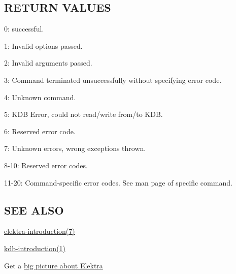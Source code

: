 \subsection*{R\+E\+T\+U\+RN V\+A\+L\+U\+ES}


\begin{DoxyItemize}
\item 0\+: successful.
\item 1\+: Invalid options passed.
\item 2\+: Invalid arguments passed.
\item 3\+: Command terminated unsuccessfully without specifying error code.
\item 4\+: Unknown command.
\item 5\+: K\+DB Error, could not read/write from/to K\+DB.
\item 6\+: Reserved error code.
\item 7\+: Unknown errors, wrong exceptions thrown.
\item 8-\/10\+: Reserved error codes.
\item 11-\/20\+: Command-\/specific error codes. See man page of specific command.
\end{DoxyItemize}

\subsection*{S\+EE A\+L\+SO}


\begin{DoxyItemize}
\item \hyperlink{md_doc_help_elektra-introduction_doc_help_elektra-introduction_md}{elektra-\/introduction(7)}
\item \hyperlink{md_doc_help_kdb-introduction_doc_help_kdb-introduction_md}{kdb-\/introduction(1)}
\item Get a \hyperlink{doc_BIGPICTURE_md}{big picture about Elektra} 
\end{DoxyItemize}